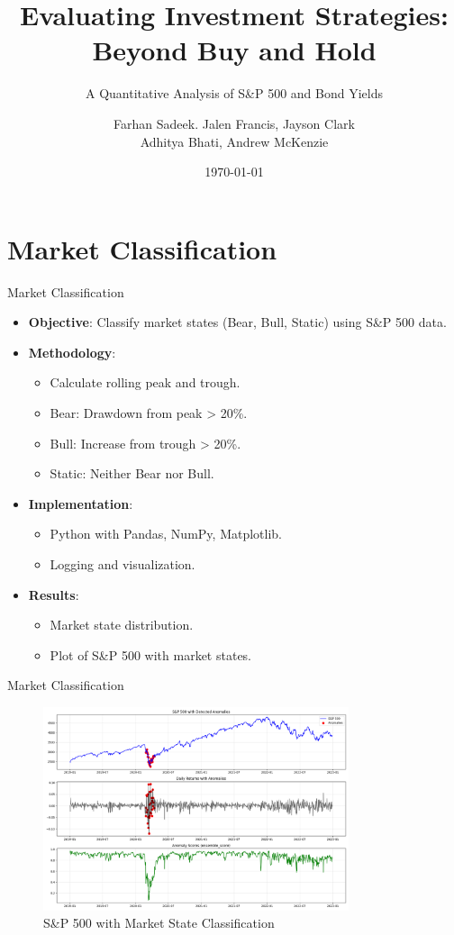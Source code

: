 \documentclass[aspectratio=169,xcolor=dvipsnames]{beamer}
\title{Evaluating Investment Strategies: Beyond Buy and Hold}
\subtitle{A Quantitative Analysis of S\&P 500 and Bond Yields}
\author{Farhan Sadeek. Jalen Francis, Jayson Clark \texorpdfstring{\\}{,} Adhitya Bhati, Andrew McKenzie}
\institute
{
    Department of Mathematics \\
    The Ohio State University %
}
\date{\today} %
\begin{document}
\begin{frame}
	\titlepage
\end{frame}

\section{Market Classification}
\begin{frame}{Market Classification}
	\begin{itemize}
		\item \textbf{Objective}: Classify market states (Bear, Bull, Static) using S\&P 500 data.
		\item \textbf{Methodology}:
		      \begin{itemize}
			      \item Calculate rolling peak and trough.
			      \item Bear: Drawdown from peak > 20\%.
			      \item Bull: Increase from trough > 20\%.
			      \item Static: Neither Bear nor Bull.
		      \end{itemize}
		\item \textbf{Implementation}:
		      \begin{itemize}
			      \item Python with Pandas, NumPy, Matplotlib.
			      \item Logging and visualization.
		      \end{itemize}
		\item \textbf{Results}:
		      \begin{itemize}
			      \item Market state distribution.
			      \item Plot of S\&P 500 with market states.
		      \end{itemize}
	\end{itemize}\end{frame}\begin{frame}{Market Classification}
	\begin{figure}
		\centering
		\includegraphics[width=0.8\textwidth]{anomalies_visualization.png}
		\caption{S\&P 500 with Market State Classification}
	\end{figure}
\end{frame}
\end{document}

